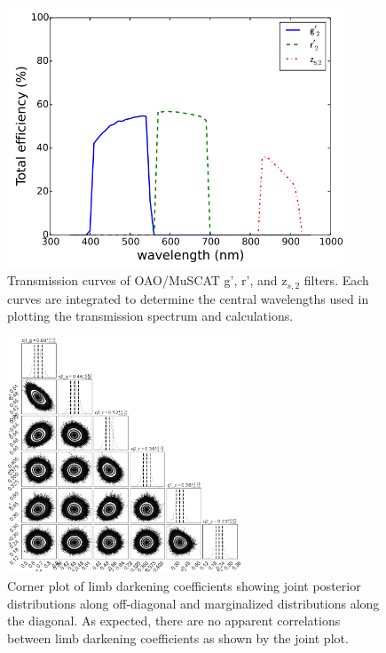 \begin{figure}
\centering
	\includegraphics[width=10cm]{figures/MuSCAT_efficiency.png}
    \caption{Transmission curves of OAO/MuSCAT g', r', and z$_{s,2}$ filters. Each curves are integrated to determine the central wavelengths used in plotting the transmission spectrum and calculations.
    }\label{fig:filter_transmission}
\end{figure}

\begin{figure}
\centering
\includegraphics[width=7cm]{hatp44/limbdark_q1q2.png}
\caption{Corner plot of limb darkening coefficients showing joint posterior distributions along off-diagonal and marginalized distributions along the diagonal. As expected, there are no apparent correlations between limb darkening coefficients as shown by the joint plot.}
\label{fig:hatp44_q1q2}
\end{figure}


